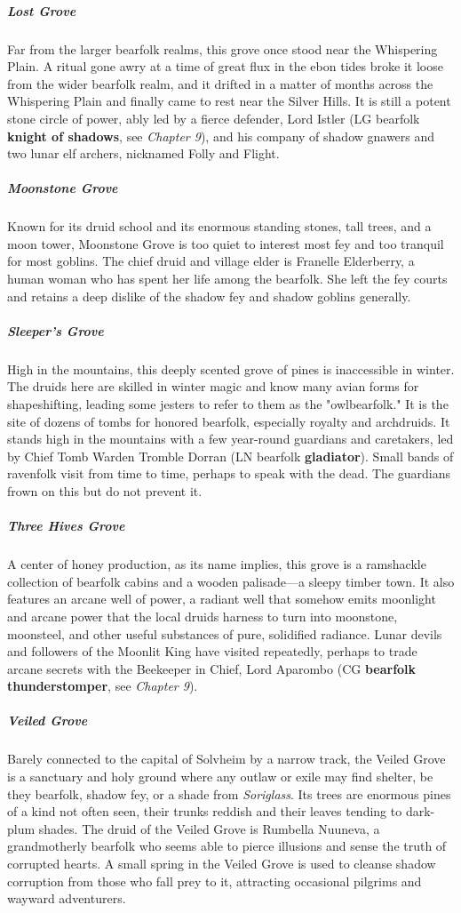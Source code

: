 \documentclass[10pt,a4paper,twoside,bg=print,twocolumn,openany,nodeprecatedcode]{dndbook}
\begin{document}
\subparagraph{Lost Grove}
Far from the larger bearfolk realms, this grove once stood near the Whispering Plain. A ritual gone awry at a time of great flux in the ebon tides broke it loose from the wider bearfolk realm, and it drifted in a matter of months across the Whispering Plain and finally came to rest near the Silver Hills. It is still a potent stone circle of power, ably led by a fierce defender, Lord Istler (LG bearfolk \textbf{knight of shadows}, see \textit{Chapter 9}), and his company of shadow gnawers and two lunar elf archers, nicknamed Folly and Flight.

\subparagraph{Moonstone Grove}
Known for its druid school and its enormous standing stones, tall trees, and a moon tower, Moonstone Grove is too quiet to interest most fey and too tranquil for most goblins. The chief druid and village elder is Franelle Elderberry, a human woman who has spent her life among the bearfolk. She left the fey courts and retains a deep dislike of the shadow fey and shadow goblins generally.

\subparagraph{Sleeper's Grove}
High in the mountains, this deeply scented grove of pines is inaccessible in winter. The druids here are skilled in winter magic and know many avian forms for shapeshifting, leading some jesters to refer to them as the "owlbearfolk." It is the site of dozens of tombs for honored bearfolk, especially royalty and archdruids. It stands high in the mountains with a few year-round guardians and caretakers, led by Chief Tomb Warden Tromble Dorran (LN bearfolk \textbf{gladiator}). Small bands of ravenfolk visit from time to time, perhaps to speak with the dead. The guardians frown on this but do not prevent it.

\subparagraph{Three Hives Grove}
A center of honey production, as its name implies, this grove is a ramshackle collection of bearfolk cabins and a wooden palisade—a sleepy timber town. It also features an arcane well of power, a radiant well that somehow emits moonlight and arcane power that the local druids harness to turn into moonstone, moonsteel, and other useful substances of pure, solidified radiance. Lunar devils and followers of the Moonlit King have visited repeatedly, perhaps to trade arcane secrets with the Beekeeper in Chief, Lord Aparombo (CG \textbf{bearfolk thunderstomper}, see \textit{Chapter 9}).

\subparagraph{Veiled Grove}
Barely connected to the capital of Solvheim by a narrow track, the Veiled Grove is a sanctuary and holy ground where any outlaw or exile may find shelter, be they bearfolk, shadow fey, or a shade from \textit{Soriglass}. Its trees are enormous pines of a kind not often seen, their trunks reddish and their leaves tending to dark-plum shades. The druid of the Veiled Grove is Rumbella Nuuneva, a grandmotherly bearfolk who seems able to pierce illusions and sense the truth of corrupted hearts. A small spring in the Veiled Grove is used to cleanse shadow corruption from those who fall prey to it, attracting occasional pilgrims and wayward adventurers.
\end{document}
